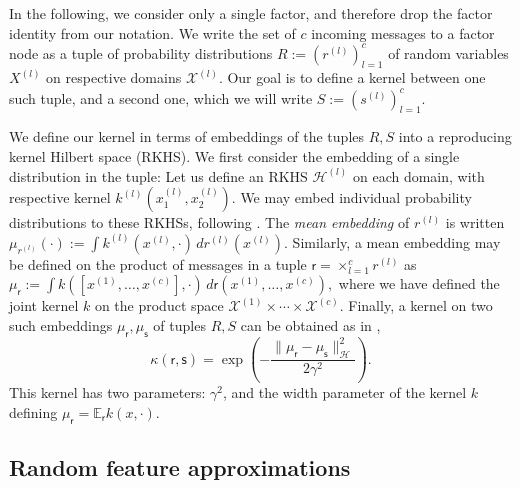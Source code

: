 \documentclass[english]{article}
\theoremstyle{plain}
\theoremstyle{plain}
\begin{document}
In the following, we consider only a single factor, and therefore drop the factor identity from our notation. We write the set of $c$ incoming messages to a factor node as a tuple of
probability distributions %
$R:=(r^{(l)})_{l=1}^c$ of random variables $X^{(l)}$ on respective  domains $\mathcal{X}^{(l)}$.
Our goal is to define a kernel between one such tuple, and a second one,
which we will write %
$S:=(s^{(l)})_{l=1}^c$.

We define our kernel in terms of embeddings of the tuples $R,S$ into a reproducing kernel Hilbert space (RKHS). We first consider the embedding of a single distribution
in the tuple: Let us define an RKHS
$\mathcal{H}^{(l)}$ on each domain, with respective kernel $k^{(l)}(x^{(l)}_1,x^{(l)}_2)$.
We may embed individual probability distributions to these RKHSs, following \citet{Smola2007}.
The {\em mean embedding} of $r^{(l)}$ is written
$\mu_{r^{(l)}}(\cdot) := \int k^{(l)}(x^{(l)},\cdot) \, dr^{(l)} (x^{(l)})$.
%
Similarly, a mean embedding may be defined on the product of  messages in a tuple
$\mathsf{r}=\times_{l=1}^{c}r^{(l)}$ as
%
$\mu_{\mathsf{r}}
:=
\int k([x^{(1)}, \ldots, x^{(c)}],\cdot) \, d\mathsf{r}(x^{(1)}, \ldots, x^{(c)}),$
where we have defined the joint kernel $k$ on the product space
$\mathcal{X}^{(1)}\times\cdots\times\mathcal{X}^{(c)}$.
Finally,  a kernel on two such embeddings $\mu_{\mathsf{r}},\mu_{\mathsf{s}}$
of tuples $R,S$ can be obtained as in \citet[eq. 9]{Christmann2010},
%
\begin{equation}
\kappa(\mathsf{r}, \mathsf{s}) = \exp\left(-\frac{\|\mu_{\mathsf{r}}-\mu_{\mathsf{s}}\|_{\mathcal{H}}^{2}}{2\gamma^{2}}\right).
\label{eq:gauss_joint_emb}
\end{equation}
%
This kernel has two parameters: $\gamma^{2}$, and the width parameter of the kernel $k$ defining $\mu_{\mathsf{r}} = \mathbb{E}_{\mathsf{r}}k(x,\cdot)$.



\subsection{Random feature approximations}
\label{sec:randomFeatureApproximations}
\end{document}
